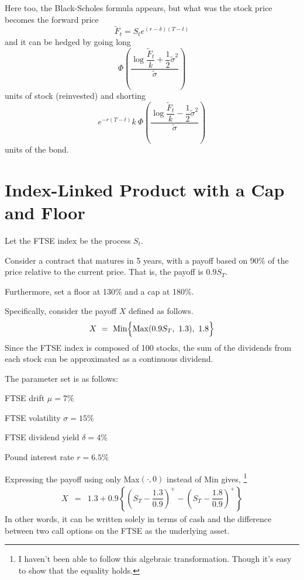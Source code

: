 \documentclass[uplatex,a4j,12pt,dvipdfmx]{jsarticle}
\begin{document}
Here too, the Black-Scholes formula appears, but what was the stock price becomes the forward price
$$
	\tilde{F}_{t}=S_{t} e^{(r - \delta)(T-t)}
$$
and it can be hedged by going long
$$
	\Phi
	\left(
	\dfrac{
		\log \dfrac{\tilde{F}_{t}}{k} + \dfrac{1}{2} \tilde{\sigma}^{2}
	}
	{\tilde{\sigma}}
	\right)
$$
units of stock (reinvested) and shorting
$$
	e^{-r(T-t)} k
	\ \! \Phi
	\left(
	\dfrac{
		\log \dfrac{\tilde{F}_{t}}{k} - \dfrac{1}{2} \tilde{\sigma}^{2}
	}
	{\tilde{\sigma}}
	\right)
$$
units of the bond.
\section{Index-Linked Product with a Cap and Floor}

Let the FTSE index be the process $S_{t}$.

Consider a contract that matures in 5 years, with a payoff based on 90\% of the price relative to the current price. That is, the payoff is $0.9S_{T}$.

Furthermore, set a floor at 130\% and a cap at 180\%.

Specifically, consider the payoff $X$ defined as follows.
$$
	X
	\ = \
	{\rm Min}
	\Big\{
	{\rm Max}
	( 0.9 S_{T} , \ 1.3 ) , \ 1.8
	\Big\}
$$
Since the FTSE index is composed of 100 stocks, the sum of the dividends from each stock can be approximated as a continuous dividend.

The parameter set is as follows:

FTSE drift $\mu = 7 \%$

FTSE volatility $\sigma = 15 \%$

FTSE dividend yield $\delta = 4 \%$

Pound interest rate $r = 6.5 \%$

Expressing the payoff using only Max$( \cdot , 0)$ instead of Min gives,
\footnote{I haven't been able to follow this algebraic transformation. Though it's easy to show that the equality holds.}
%
%
\begin{eqnarray*}
	X
	&=&
	1.3
	+
	0.9
	\left\{
	\left( S_{T} - \dfrac{1.3}{0.9} \right)^{+}
	-
	\left( S_{T} - \dfrac{1.8}{0.9} \right)^{+}
	\right\}
\end{eqnarray*}
%
%
In other words, it can be written solely in terms of cash and the difference between two call options on the FTSE as the underlying asset.
\end{document}
